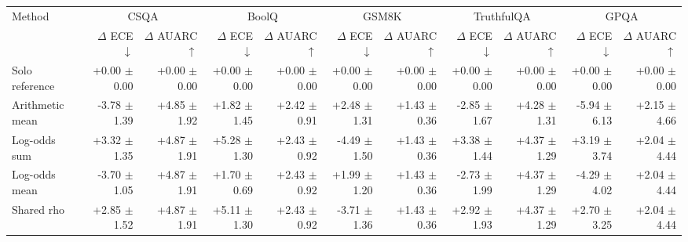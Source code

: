 \begin{tabular}{lrrrrrrrrrr}
\toprule
Method & \multicolumn{2}{c}{CSQA} & \multicolumn{2}{c}{BoolQ} & \multicolumn{2}{c}{GSM8K} & \multicolumn{2}{c}{TruthfulQA} & \multicolumn{2}{c}{GPQA} \\
 & $\Delta$ ECE $\downarrow$ & $\Delta$ AUARC $\uparrow$ & $\Delta$ ECE $\downarrow$ & $\Delta$ AUARC $\uparrow$ & $\Delta$ ECE $\downarrow$ & $\Delta$ AUARC $\uparrow$ & $\Delta$ ECE $\downarrow$ & $\Delta$ AUARC $\uparrow$ & $\Delta$ ECE $\downarrow$ & $\Delta$ AUARC $\uparrow$ \\
\midrule
Solo reference & +0.00 {\scriptsize $\pm$ 0.00} & +0.00 {\scriptsize $\pm$ 0.00} & +0.00 {\scriptsize $\pm$ 0.00} & +0.00 {\scriptsize $\pm$ 0.00} & +0.00 {\scriptsize $\pm$ 0.00} & +0.00 {\scriptsize $\pm$ 0.00} & +0.00 {\scriptsize $\pm$ 0.00} & +0.00 {\scriptsize $\pm$ 0.00} & +0.00 {\scriptsize $\pm$ 0.00} & +0.00 {\scriptsize $\pm$ 0.00} \\
Arithmetic mean & -3.78 {\scriptsize $\pm$ 1.39} & +4.85 {\scriptsize $\pm$ 1.92} & +1.82 {\scriptsize $\pm$ 1.45} & +2.42 {\scriptsize $\pm$ 0.91} & +2.48 {\scriptsize $\pm$ 1.31} & +1.43 {\scriptsize $\pm$ 0.36} & -2.85 {\scriptsize $\pm$ 1.67} & +4.28 {\scriptsize $\pm$ 1.31} & -5.94 {\scriptsize $\pm$ 6.13} & +2.15 {\scriptsize $\pm$ 4.66} \\
Log-odds sum & +3.32 {\scriptsize $\pm$ 1.35} & +4.87 {\scriptsize $\pm$ 1.91} & +5.28 {\scriptsize $\pm$ 1.30} & +2.43 {\scriptsize $\pm$ 0.92} & -4.49 {\scriptsize $\pm$ 1.50} & +1.43 {\scriptsize $\pm$ 0.36} & +3.38 {\scriptsize $\pm$ 1.44} & +4.37 {\scriptsize $\pm$ 1.29} & +3.19 {\scriptsize $\pm$ 3.74} & +2.04 {\scriptsize $\pm$ 4.44} \\
Log-odds mean & -3.70 {\scriptsize $\pm$ 1.05} & +4.87 {\scriptsize $\pm$ 1.91} & +1.70 {\scriptsize $\pm$ 0.69} & +2.43 {\scriptsize $\pm$ 0.92} & +1.99 {\scriptsize $\pm$ 1.20} & +1.43 {\scriptsize $\pm$ 0.36} & -2.73 {\scriptsize $\pm$ 1.99} & +4.37 {\scriptsize $\pm$ 1.29} & -4.29 {\scriptsize $\pm$ 4.02} & +2.04 {\scriptsize $\pm$ 4.44} \\
Shared rho & +2.85 {\scriptsize $\pm$ 1.52} & +4.87 {\scriptsize $\pm$ 1.91} & +5.11 {\scriptsize $\pm$ 1.30} & +2.43 {\scriptsize $\pm$ 0.92} & -3.71 {\scriptsize $\pm$ 1.36} & +1.43 {\scriptsize $\pm$ 0.36} & +2.92 {\scriptsize $\pm$ 1.93} & +4.37 {\scriptsize $\pm$ 1.29} & +2.70 {\scriptsize $\pm$ 3.25} & +2.04 {\scriptsize $\pm$ 4.44} \\

\end{tabular}

